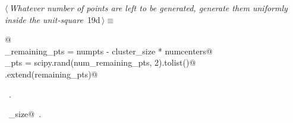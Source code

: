 \documentclass[11.5pt]{report}
\begin{document}
\vspace{-0.8cm} \newchunk
\begin{flushleft} \small
\begin{minipage}{\linewidth}\label{scrap21}\raggedright\small
{} $\langle\,${\itshape Whatever number of points are left to be generated, generate them uniformly inside the unit-square}\nobreak\ {\footnotesize {19d}}$\,\rangle\equiv$
\vspace{-1ex}
\begin{list}{}{} \item
\mbox{}\verb@   @\\
\mbox{}\verb@num_remaining_pts = numpts - cluster_size * numcenters@\\
\mbox{}\verb@remaining_pts = scipy.rand(num_remaining_pts, 2).tolist()@\\
\mbox{}\verb@points.extend(remaining_pts)@\\
\mbox{}\verb@@{\NWsep}
\end{list}
\vspace{-1.5ex}
\footnotesize
\begin{list}{}{\setlength{\itemsep}{-\parsep}\setlength{\itemindent}{-\leftmargin}}
\item \NWtxtMacroRefIn\ .
\item \NWtxtIdentsUsed\nobreak\  \verb@cluster_size@\nobreak\ .
\item{}
\end{list}
\end{minipage}\vspace{4ex}
\end{flushleft}
\end{document}
